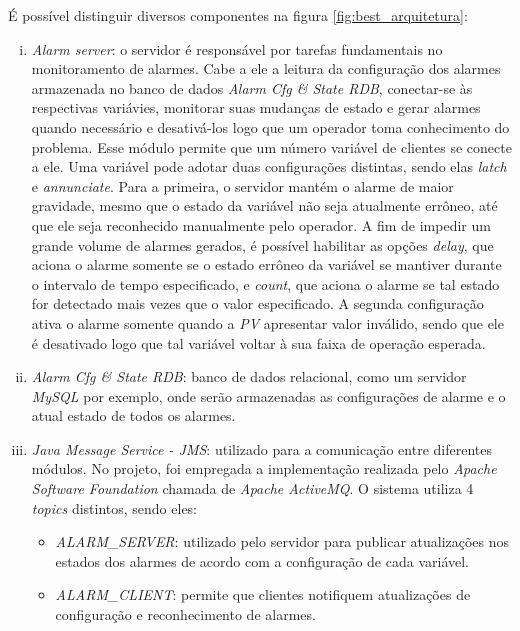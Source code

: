 É possível distinguir diversos componentes na figura \ref{fig:best_arquitetura}:

\begin{enumerate}[i.]
  
  \item \textit{Alarm server}: o servidor é responsável por tarefas fundamentais
  no monitoramento de alarmes. Cabe a ele a leitura da configuração dos alarmes
  armazenada no banco de dados \textit{Alarm Cfg \& State RDB}, conectar-se às
  respectivas variávies, monitorar suas mudanças de estado e gerar alarmes
  quando necessário e desativá-los logo que um operador toma conhecimento
  do problema. Esse módulo permite que um número variável de clientes se conecte
  a ele. Uma variável pode adotar duas configurações distintas, sendo elas
  \textit{latch} e \textit{annunciate}. Para a primeira, o servidor mantém o
  alarme de maior gravidade, mesmo que o estado da variável não seja
  atualmente errôneo, até que ele seja reconhecido manualmente pelo operador.
  A fim de impedir um grande volume de alarmes gerados, é possível habilitar
  as opções \textit{delay}, que aciona o alarme somente se o estado errôneo da
  variável se mantiver durante o intervalo de tempo especificado, e
  \textit{count}, que aciona o alarme se tal estado for detectado mais vezes
  que o valor especificado. A segunda configuração ativa o alarme somente
  quando a \textit{PV} apresentar valor inválido, sendo que ele é desativado
  logo que tal variável voltar à sua faixa de operação esperada.
  
  \item \textit{Alarm Cfg \& State RDB}: banco de dados relacional, como um
  servidor \textit{MySQL} por exemplo, onde serão armazenadas as configurações
  de alarme e o atual estado de todos os alarmes.
  
  \item \textit{Java Message Service - JMS}: utilizado para a comunicação entre
  diferentes módulos. No projeto, foi empregada a implementação realizada pelo
  \textit{Apache Software Foundation} chamada de  \textit{Apache ActiveMQ}. O
  sistema utiliza 4 \textit{topics} distintos, sendo eles:
  
  \begin{itemize} \renewcommand\labelitemi{--}
    \item \textit{ALARM\_SERVER}: utilizado pelo servidor para publicar
    atualizações nos estados dos alarmes de acordo com a configuração de cada
    variável.
    
    \item \textit{ALARM\_CLIENT}: permite que clientes notifiquem atualizações
    de configuração e reconhecimento de alarmes.
    

\end{itemize}
\end{enumerate}
